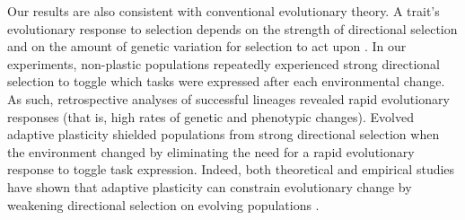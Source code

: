 Our results are also consistent with conventional evolutionary theory.
A trait's evolutionary response to selection depends on the strength of directional selection and on the amount of genetic variation for selection to act upon \citep{lande_measurement_1983,zimmer_evolution_2013}.
In our experiments, non-plastic populations repeatedly experienced strong directional selection to toggle which tasks were expressed after each environmental change.
As such, retrospective analyses of successful lineages revealed rapid evolutionary responses (that is, high rates of genetic and phenotypic changes).
Evolved adaptive plasticity shielded populations from strong directional selection when the environment changed by eliminating the need for a rapid evolutionary response to toggle task expression.
Indeed, both theoretical and empirical studies have shown that adaptive plasticity can constrain evolutionary change by weakening directional selection on evolving populations \citep{price_role_2003,paenke_influence_2007,ghalambor_non-adaptive_2015}. 


\vspace{0.25cm}
